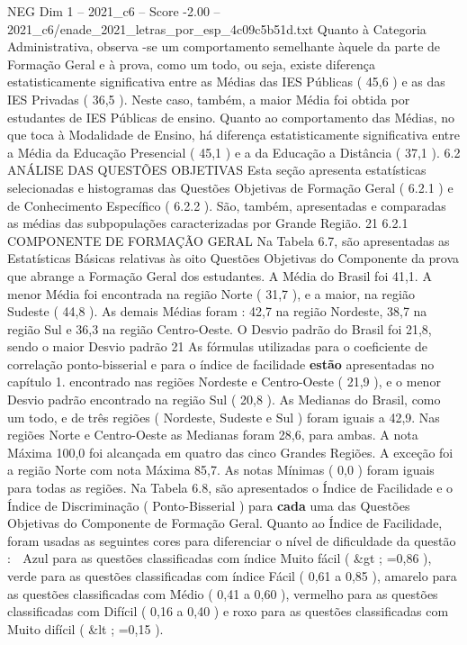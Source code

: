 \begin{textsample}{NEG Dim 1 – 2021\_c6 – Score -2.00 – 2021\_c6/enade\_2021\_letras\_por\_esp\_4c09c5b51d.txt}
Quanto à Categoria Administrativa, observa -se um comportamento semelhante àquele da parte de Formação Geral e à prova, como um todo, ou seja, existe diferença estatisticamente significativa entre as Médias das IES Públicas ( 45,6 ) e as das IES Privadas ( 36,5 ).
Neste caso, também, a maior Média foi obtida por estudantes de IES Públicas de ensino.
Quanto ao comportamento das Médias, no que toca à Modalidade de Ensino, há diferença estatisticamente significativa entre a Média da Educação Presencial ( 45,1 ) e a da Educação a Distância ( 37,1 ). 6.2 ANÁLISE DAS QUESTÕES OBJETIVAS Esta seção apresenta estatísticas selecionadas e histogramas das Questões Objetivas de Formação Geral ( 6.2.1 ) e de Conhecimento Específico ( 6.2.2 ).
São, também, apresentadas e comparadas as médias das subpopulações caracterizadas por Grande Região. 21 6.2.1 COMPONENTE DE FORMAÇÃO GERAL Na Tabela 6.7, são apresentadas as Estatísticas Básicas relativas às oito Questões Objetivas do Componente da prova que abrange a Formação Geral dos estudantes.
A Média do Brasil foi 41,1.
A menor Média foi encontrada na região Norte ( 31,7 ), e a maior, na região Sudeste ( 44,8 ).
As demais Médias foram : 42,7 na região Nordeste, 38,7 na região Sul e 36,3 na região Centro-Oeste.
O Desvio padrão do Brasil foi 21,8, sendo o maior Desvio padrão 21 As fórmulas utilizadas para o coeficiente de correlação ponto-bisserial e para o índice de facilidade \textbf{estão} apresentadas no capítulo 1. encontrado nas regiões Nordeste e Centro-Oeste ( 21,9 ), e o menor Desvio padrão encontrado na região Sul ( 20,8 ).
As Medianas do Brasil, como um todo, e de três regiões ( Nordeste, Sudeste e Sul ) foram iguais a 42,9.
Nas regiões Norte e Centro-Oeste as Medianas foram 28,6, para ambas.
A nota Máxima 100,0 foi alcançada em quatro das cinco Grandes Regiões.
A exceção foi a região Norte com nota Máxima 85,7.
As notas Mínimas ( 0,0 ) foram iguais para todas as regiões.
Na Tabela 6.8, são apresentados o Índice de Facilidade e o Índice de Discriminação ( Ponto-Bisserial ) para \textbf{cada} uma das Questões Objetivas do Componente de Formação Geral.
Quanto ao Índice de Facilidade, foram usadas as seguintes cores para diferenciar o nível de dificuldade da questão :  Azul para as questões classificadas com índice Muito fácil ( \&gt ; =0,86 ), verde para as questões classificadas com índice Fácil ( 0,61 a 0,85 ), amarelo para as questões classificadas com Médio ( 0,41 a 0,60 ), vermelho para as questões classificadas com Difícil ( 0,16 a 0,40 ) e roxo para as questões classificadas com Muito difícil ( \&lt ; =0,15 ).

\end{textsample}
